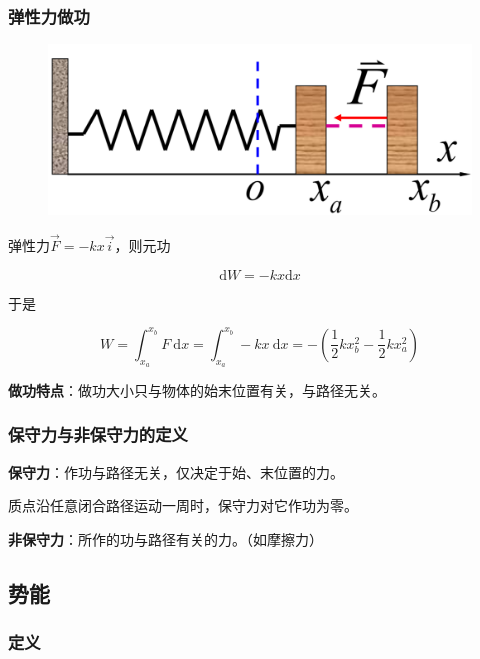 \documentclass[
	12pt, %
	a4paper, %
]{myLegrandOrangeBook}
\newcommand{\rmd}{\mathrm{d}}
\begin{document}
\subsubsection{弹性力做功}

\begin{figure}
    \centering
    \includegraphics[scale=0.12]{"Chapter 03 images/pic5.png"}
    \label{pic5}
\end{figure}

弹性力\(\overrightarrow{F} = -kx\overrightarrow{i}\)，则元功

\[
    \rmd W = -kx \rmd x
\]

于是

\begin{equation}
    W=\int_{x_a}^{x_b} F \mathrm{~d} x=\int_{x_a}^{x_b}-k x \mathrm{~d} x=-\left(\frac{1}{2} k x_b^2-\frac{1}{2} k x_a^2\right)
\end{equation}

\textbf{做功特点}：做功大小只与物体的始末位置有关，与路径无关。

\subsubsection{保守力与非保守力的定义}

\textbf{保守力}：作功与路径无关，仅决定于始、末位置的力。

质点沿任意闭合路径运动一周时，保守力对它作功为零。

\textbf{非保守力}：所作的功与路径有关的力。（如摩擦力）

\subsection{势能}

\subsubsection{定义}
\end{document}
